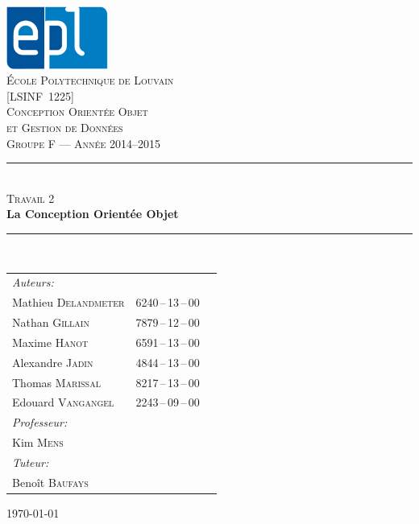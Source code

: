 \documentclass[11pt, a4, oneside, headings=normal]{scrreprt}
\newcommand{\HRule}{\rule{\linewidth}{0.5mm}}
\begin{document}

\begin{titlepage}
\begin{center}

\includegraphics[width=0.25\textwidth]{epl-logo}~\\[0.4cm]

\textsc{\LARGE École Polytechnique de Louvain}\\[1.2cm]
\textsc{\Large [LSINF~1225]}\\[0.05cm]
\textsc{\Large Conception Orientée Objet }\\[0.1cm]
\textsc{\Large et Gestion de Données}\\[1.0cm]


\textsc{\Large Groupe F --- Année 2014--2015}\\[0.8cm]

\HRule \\[0.5cm]
\textsc{\LARGE  Travail 2}\\[0.1cm]
{ \huge \bfseries La Conception Orientée Objet\\[0.3cm] }

\HRule \\[0.6cm]

{\large
\begin{tabu} to 0.7\linewidth {Xll}
    \emph{Auteurs:}\\
    \quad Mathieu \textsc{Delandmeter} & 6240\,--\,13\,--\,00\\
    \quad Nathan \textsc{Gillain} & 7879\,--\,12\,--\,00\\
    \quad Maxime \textsc{Hanot} & 6591\,--\,13\,--\,00\\
    \quad Alexandre \textsc{Jadin} & 4844\,--\,13\,--\,00\\
    \quad Thomas \textsc{Marissal} & 8217\,--\,13\,--\,00\\
    \quad Edouard \textsc{Vangangel} & 2243\,--\,09\,--\,00\\[.5ex]   
    \emph{Professeur:} \\
    \quad Kim \textsc{Mens}\\[.5ex]
    \emph{Tuteur:}\\
    \quad Benoît \textsc{Baufays}\\
\end{tabu}
}

\vfill

{\large \today}

\end{center}
\end{titlepage}
\end{document}
